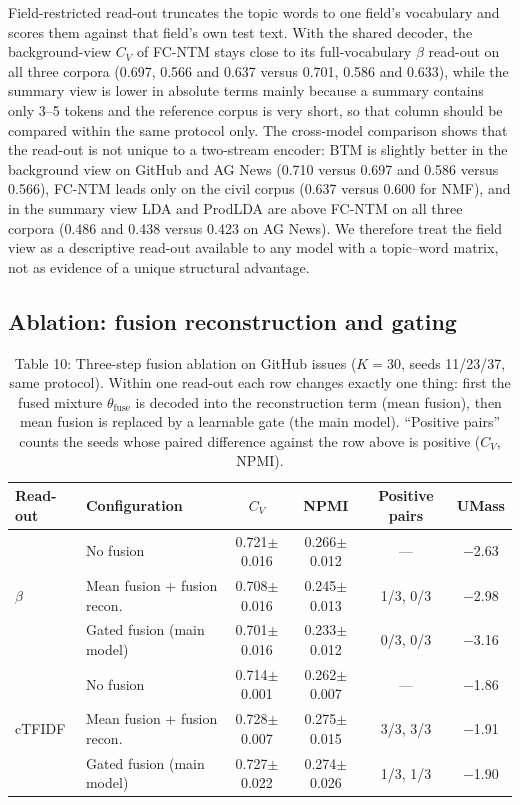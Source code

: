 \documentclass{article}
\begin{document}
Field-restricted read-out truncates the topic words to one field's vocabulary and scores them
against that field's own test text. With the shared decoder, the background-view $C_V$ of
FC-NTM stays close to its full-vocabulary $\beta$ read-out on all three corpora (0.697, 0.566
and 0.637 versus 0.701, 0.586 and 0.633), while the summary view is lower in absolute terms mainly
because a summary contains only 3--5 tokens and the reference corpus is very short, so that column
should be compared within the same protocol only. The cross-model comparison shows that the
read-out is not unique to a two-stream encoder: BTM is slightly better in the background view on
GitHub and AG News (0.710 versus 0.697 and 0.586 versus 0.566), FC-NTM leads only on the civil
corpus (0.637 versus 0.600 for NMF), and in the summary view LDA and ProdLDA are above FC-NTM
on all three corpora (0.486 and 0.438 versus 0.423 on AG News). We therefore treat the field view
as a descriptive read-out available to any model with a topic--word matrix, not as evidence of a
unique structural advantage.

\subsection{Ablation: fusion reconstruction and gating}

\begin{table}[t]
\centering
\caption{Table 10: Three-step fusion ablation on GitHub issues ($K=30$, seeds 11/23/37, same protocol). Within one read-out each row changes exactly one thing: first the fused mixture $\theta_{\mathrm{fuse}}$ is decoded into the reconstruction term (mean fusion), then mean fusion is replaced by a learnable gate (the main model). ``Positive pairs'' counts the seeds whose paired difference against the row above is positive ($C_V$, NPMI).}
\label{tab:fusion}
\small
\begin{tabular}{llcccc}
\toprule
Read-out & Configuration & $C_V$ & NPMI & Positive pairs & UMass \\
\midrule
\multirow{3}{*}{$\beta$} & No fusion & 0.721$\pm$0.016 & 0.266$\pm$0.012 & --- & $-$2.63 \\
 & Mean fusion + fusion recon. & 0.708$\pm$0.016 & 0.245$\pm$0.013 & 1/3, 0/3 & $-$2.98 \\
 & Gated fusion (main model) & 0.701$\pm$0.016 & 0.233$\pm$0.012 & 0/3, 0/3 & $-$3.16 \\
\midrule
\multirow{3}{*}{cTFIDF} & No fusion & 0.714$\pm$0.001 & 0.262$\pm$0.007 & --- & $-$1.86 \\
 & Mean fusion + fusion recon. & 0.728$\pm$0.007 & 0.275$\pm$0.015 & 3/3, 3/3 & $-$1.91 \\
 & Gated fusion (main model) & 0.727$\pm$0.022 & 0.274$\pm$0.026 & 1/3, 1/3 & $-$1.90 \\
\bottomrule
\end{tabular}
\end{table}
\end{document}
